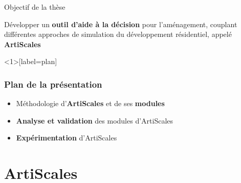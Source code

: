 \documentclass[xcolor=table]{beamer}
\begin{document}
\begin{frame}{Objectif de la thèse}
	\begin{block}{}
		Développer un \textbf{outil d'aide à la décision} pour l'aménagement, couplant différentes approches de simulation du développement résidentiel, appelé \textbf{ArtiScales}
	\end{block}
\end{frame}




\begin{frame}<1>[label=plan]
\frametitle{Plan de la présentation}
	\begin{itemize}
		\item \alert<1>{Méthodologie d'\textbf{ArtiScales} et de ses \textbf{modules}}
		\item \alert<2>{\textbf{Analyse et validation} des modules d'ArtiScales}
		\item \alert<3>{\textbf{Expérimentation} d'ArtiScales}
	\end{itemize}
\end{frame}


\section{ArtiScales}
\end{document}
